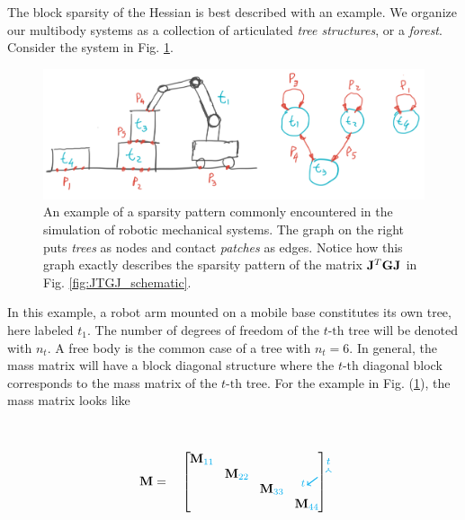 The block sparsity of the Hessian is best described with an example. We organize
our multibody systems as a collection of articulated \emph{tree structures}, or
a \emph{forest}. Consider the system in Fig. \ref{fig:sparsity_example}.
\begin{figure}[!h]
	\centering
	\includegraphics[width=0.7\columnwidth]{figures/sparsity_example.png}
	\caption{\label{fig:sparsity_example} 
	An example of a sparsity pattern commonly encountered in the
	simulation of robotic mechanical systems. The graph on the right puts
	\textit{trees} as nodes and contact \textit{patches} as edges. Notice how
	this graph exactly describes the sparsity pattern of the matrix
	${\mathbf{J}}^T{\mathbf{G}}{\mathbf{J}}$ in Fig. \ref{fig:JTGJ_schematic}.}
\end{figure}
In this example, a robot arm mounted on a mobile base constitutes its own tree,
here labeled $t_1$. The number of degrees of freedom of the $t\text{-th}$ tree
will be denoted with $n_t$. A free body is the common case of a tree with
$n_t=6$. In general, the mass matrix will have a
block diagonal structure where the $t\text{-th}$ diagonal block corresponds to
the mass matrix of the $t\text{-th}$ tree. For the example in Fig.
(\ref{fig:sparsity_example}), the mass matrix looks like\\\\\\
\begin{equation}
	\mf{M}=\quad
	\begin{bmatrix}
		\tikzmark{M_topleft}
		\diagentry{\mf{M}_{\cc{11}}}&&&\tikzmark{M_topright}\\
		&\diagentry{\mf{M}_{\cc{22}}}\\
		&&\diagentry{\mf{M}_{\cc{33}}}\\		
		\tikzmark{M_bottomleft}&&&\diagentry{\mf{M}_{\cc{44}}}
	\end{bmatrix}
\tikz[overlay,remember picture] {
	\draw[->,thick,color=cyan]
  ([yshift=3ex]M_topleft) -- ([yshift=3ex]M_topright) node[midway,above]
  {\scriptsize $t$}; 
  \draw[->,thick,color=cyan]
  ([yshift=1.5ex,xshift=-2ex]M_topleft) -- ([xshift=-4ex]M_bottomleft)
  node[near end,left] {\scriptsize $t$};}	
\end{equation}


